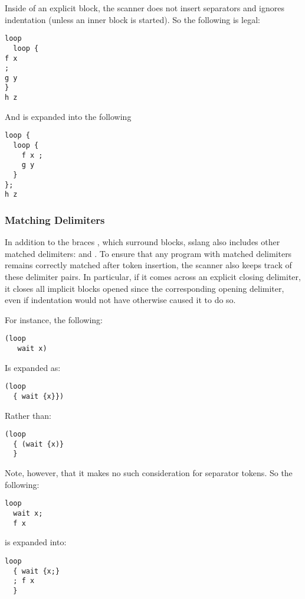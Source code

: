 \documentclass{article}
\begin{document}
Inside of an explicit block, the scanner does not insert separators and ignores
indentation (unless an inner block is started). So the following is legal:

\begin{lstlisting}
loop
  loop {
f x
;
g y
}
h z
\end{lstlisting}

And is expanded into the following

\begin{lstlisting}
loop {
  loop {
    f x ;
    g y
  }
};
h z
\end{lstlisting}

\subsubsection{Matching Delimiters}

In addition to the braces \lit*{\{} \lit*{\}}, which surround blocks,
sslang also includes other matched delimiters: \lit*{[} \lit*{]} and \lit*{(} \lit*{)}.
To ensure that any program with matched delimiters remains correctly matched
after token insertion, the scanner also keeps track of these delimiter pairs.
In particular, if it comes across an explicit closing delimiter, it closes all
implicit blocks opened since the corresponding opening delimiter, even if
indentation would not have otherwise caused it to do so.

For instance, the following:

\begin{lstlisting}
(loop
   wait x)
\end{lstlisting}

Is expanded as:

\begin{lstlisting}
(loop
  { wait {x}})
\end{lstlisting}

Rather than:

\begin{lstlisting}
(loop
  { (wait {x)}
  }
\end{lstlisting}

Note, however, that it makes no such consideration for separator tokens. So the following:

\begin{lstlisting}
loop
  wait x;
  f x
\end{lstlisting}

is expanded into:

\begin{lstlisting}
loop
  { wait {x;}
  ; f x
  }
\end{lstlisting}
\end{document}
